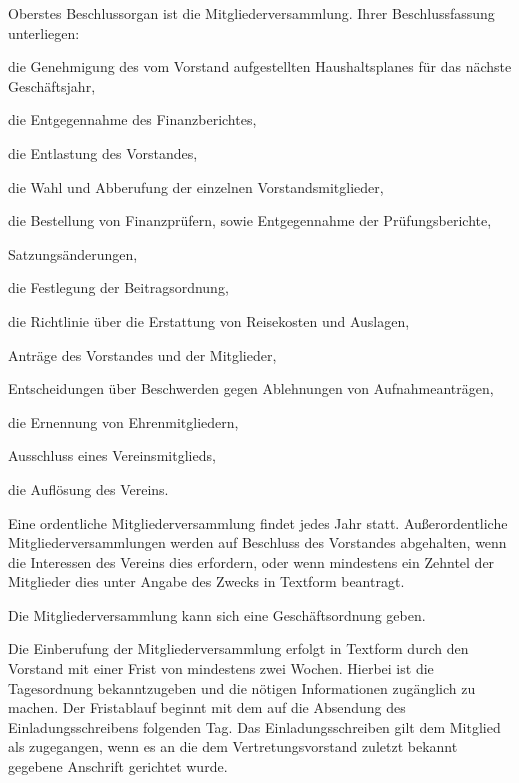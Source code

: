 \documentclass[draft]{scrartcl}
\begin{document}
\begin{contract}
\label{Mitgliederversammlung}

Oberstes Beschlussorgan ist die Mitgliederversammlung. Ihrer Beschlussfassung
unterliegen:

\begin{compactenum}[\hspace{2em}1.]
  \item die Genehmigung des vom Vorstand aufgestellten Haushaltsplanes für das
    näch\-ste Geschäftsjahr,
  \item die Entgegennahme des Finanzberichtes,
  \item die Entlastung des Vorstandes,
  \item die Wahl und Abberufung der einzelnen Vorstandsmitglieder,
  \item die Bestellung von Finanzprüfern, sowie Entgegennahme der
    Prüfungsberichte,
  \item Satzungsänderungen,
  \item die Festlegung der Beitragsordnung,
  \item die Richtlinie über die Erstattung von Reisekosten und Auslagen,
  \item Anträge des Vorstandes und der Mitglieder,
  \item Entscheidungen über Beschwerden gegen Ablehnungen von
    Aufnahmeanträgen,
  \item die Ernennung von Ehrenmitgliedern,
  \item Ausschluss eines Vereinsmitglieds,
  \item die Auf\/lösung des Vereins.
\end{compactenum}

Eine ordentliche Mitgliederversammlung findet jedes Jahr statt. Außerordentliche
Mitgliederversammlungen werden auf Beschluss des Vorstandes abgehalten, wenn die
Interessen des Vereins dies erfordern, oder wenn mindestens ein Zehntel der
Mitglieder dies unter Angabe des Zwecks in Textform beantragt.

Die Mitgliederversammlung kann sich eine Geschäftsordnung geben.


Die Einberufung der Mitgliederversammlung erfolgt in Textform durch den
Vorstand mit einer Frist von mindestens zwei Wochen. Hierbei ist die
Tagesordnung bekanntzugeben und die nötigen Informationen zugänglich zu
machen. Der Fristablauf beginnt mit dem auf die Absendung des
Einladungsschreibens folgenden Tag. Das Einladungsschreiben gilt dem Mitglied
als zugegangen, wenn es an die dem Vertretungsvorstand zuletzt bekannt
gegebene Anschrift gerichtet wurde.


\end{contract}
\end{document}
